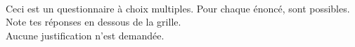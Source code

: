 \documentclass[a4paper,11pt]{article}
\begin{document}
\begin{exercice}[(4 points)] \

	\begin{attention}
		Ceci est un questionnaire à choix multiples. Pour chaque énoncé, \textbf{} \textbf{} sont possibles. \\[0.5em]
		Note tes réponses en dessous de la grille. \\[0.5em]
		Aucune justification n'est demandée.

		\begin{other_exemple}
		\end{other_exemple}
	\end{attention}


\end{exercice}
\end{document}
